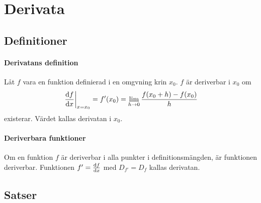 \section{Derivata}

\subsection{Definitioner}

\paragraph{Derivatans definition}
Låt $f$ vara en funktion definierad i en omgvning krin $x_0$. $f$ är deriverbar i $x_0$ om
\begin{align*}
	\eval{\dv{f}{x}}_{x = x_0} = f'(x_0) = \lim\limits_{h\to 0}\frac{f(x_0 + h) - f(x_0)}{h}
\end{align*}
existerar. Värdet kallas derivatan i $x_0$.

\paragraph{Deriverbara funktioner}
Om en funktion $f$ är deriverbar i alla punkter i definitionsmängden, är funktionen deriverbar. Funktionen $f' = \dv{f}{x}$ med $D_{f'} = D_f$ kallas derivatan.

\subsection{Satser}